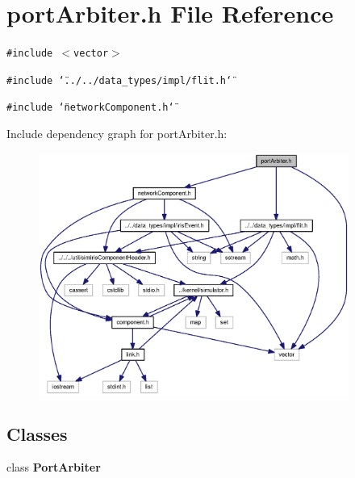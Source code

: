 \section{portArbiter.h File Reference}
\label{portArbiter_8h}
{\tt \#include $<$vector$>$}\par
{\tt \#include \char`\"{}../../data\_\-types/impl/flit.h\char`\"{}}\par
{\tt \#include \char`\"{}networkComponent.h\char`\"{}}\par


Include dependency graph for portArbiter.h:\nopagebreak
\begin{figure}[H]
\begin{center}
\leavevmode
\includegraphics[width=288pt]{portArbiter_8h__incl}
\end{center}
\end{figure}
\subsection*{Classes}
\begin{CompactItemize}
\item 
class {\bf PortArbiter}
\end{CompactItemize}
